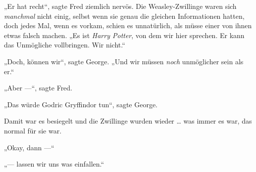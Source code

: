 „Er hat recht“, sagte Fred ziemlich nervös. Die Weasley-Zwillinge waren sich \emph{manchmal} nicht einig, selbst wenn sie genau die gleichen Informationen hatten, doch jedes Mal, wenn es vorkam, schien es unnatürlich, als müsse einer von ihnen etwas falsch machen.
„Es ist \emph{Harry Potter}, von dem wir hier sprechen. Er kann das Unmögliche vollbringen. Wir nicht.“

„Doch, können wir“, sagte George.
„Und wir müssen \emph{noch} unmöglicher sein als er.“

„Aber —“, sagte Fred.

„Das würde Godric Gryffindor tun“, sagte George.

Damit war es besiegelt und die Zwillinge wurden wieder … was immer es war, das normal für sie war.

„Okay, dann —“

„— lassen wir uns was einfallen.“

